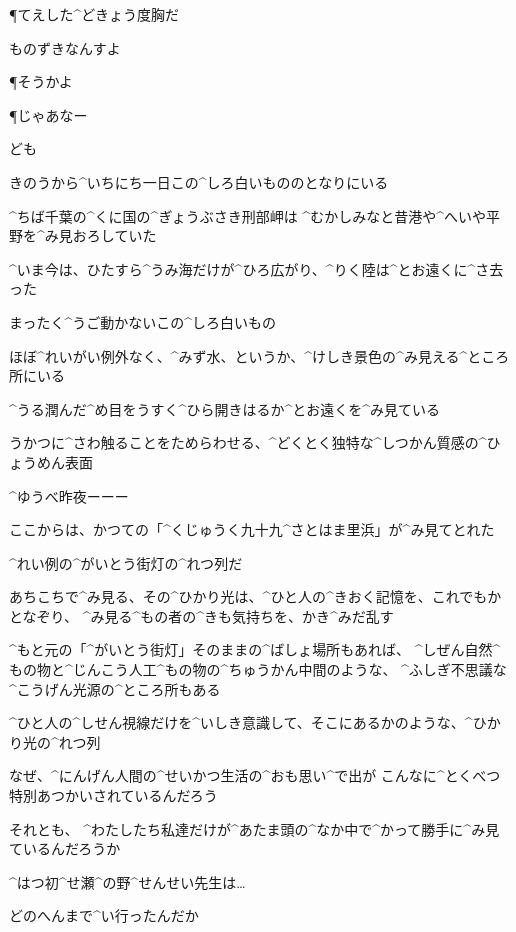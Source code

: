 \P てえした^{どきょう}{度胸}だ

\Y ものずきなんすよ

\P そうかよ

\page
\P じゃあなー

\Y ども

\page
\Y きのうから^{いちにち}{一日}この^{しろ}{白}いもののとなりにいる

\Y ^{ちば}{千葉}の^{くに}{国}の^{ぎょうぶさき}{刑部岬}は
^{むかしみなと}{昔港}や^{へいや}{平野}を^{み}{見}おろしていた

\Y ^{いま}{今}は、ひたすら^{うみ}{海}だけが^{ひろ}{広}がり、^{りく}{陸}は^{とお}{遠}くに^{さ}{去}った

\page
\Y まったく^{うご}{動}かないこの^{しろ}{白}いもの

\Y ほぼ^{れいがい}{例外}なく、^{みず}{水}、というか、^{けしき}{景色}の^{み}{見}える^{ところ}{所}にいる

\Y ^{うる}{潤}んだ^{め}{目}をうすく^{ひら}{開}きはるか^{とお}{遠}くを^{み}{見}ている

\Y うかつに^{さわ}{触}ることをためらわせる、^{どくとく}{独特}な^{しつかん}{質感}の^{ひょうめん}{表面}

\page
\Y ^{ゆうべ}{昨夜}ーーー

\Y ここからは、かつての「^{くじゅうく}{九十九}^{さとはま}{里浜}」が^{み}{見}てとれた

\Y ^{れい}{例}の^{がいとう}{街灯}の^{れつ}{列}だ

\page
\Y あちこちで^{み}{見}る、その^{ひかり}{光}は、^{ひと}{人}の^{きおく}{記憶}を、これでもかとなぞり、
^{み}{見}る^{もの}{者}の^{きも}{気持}ちを、かき^{みだ}{乱}す

\Y ^{もと}{元}の「^{がいとう}{街灯}」そのままの^{ばしょ}{場所}もあれば、
^{しぜん}{自然}^{もの}{物}と^{じんこう}{人工}^{もの}{物}の^{ちゅうかん}{中間}のような、
^{ふしぎ}{不思議}な^{こうげん}{光源}の^{ところ}{所}もある

\Y ^{ひと}{人}の^{しせん}{視線}だけを^{いしき}{意識}して、そこにあるかのような、^{ひかり}{光}の^{れつ}{列}

\page
\Y なぜ、^{にんげん}{人間}の^{せいかつ}{生活}の^{おも}{思}い^{で}{出}が
こんなに^{とくべつ}{特別}あつかいされているんだろう

\Y それとも、
^{わたしたち}{私達}だけが^{あたま}{頭}の^{なか}{中}で^{かって}{勝手}に^{み}{見}ているんだろうか

\page
\Y ^{はつ}{初}^{せ}{瀬}^{の}{野}^{せんせい}{先生}は…

\Y どのへんまで^{い}{行}ったんだか

